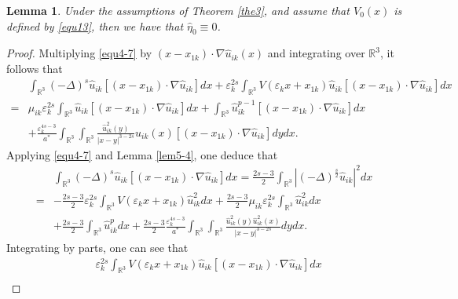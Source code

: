 \documentclass[reqno, 11pt]{amsart} %
\numberwithin{equation}{section}
\newtheorem{lemma}[theorem]{Lemma}
\begin{document}
	\begin{lemma}\label{lem4-4}
		Under the assumptions of Theorem \ref{the3}, and assume that $V_{0}(x)$ is defined by \eqref{equ13}, then we have that $\hat{\eta}_{0}\equiv0$.
	\end{lemma}
	\begin{proof}
		Multiplying \eqref{equ4-7} by $(x-x_{1k})\cdot\nabla\hat{u}_{ik}(x)$ and integrating over $\mathbb{R}^{3}$, it follows that
		\begin{equation}\label{equ4-29}
			\begin{split}
				&\int_{\mathbb{R}^{3}}(-\Delta)^{s}\hat{u}_{ik}[(x-x_{1k})\cdot\nabla\hat{u}_{ik}]dx+\varepsilon_{k}^{2s}\int_{\mathbb{R}^{3}}V(\varepsilon_{k}x+x_{1k})\hat{u}_{ik}[(x-x_{1k})\cdot\nabla\hat{u}_{ik}]dx\\
				=&\mu_{ik}\varepsilon_{k}^{2s}\int_{\mathbb{R}^{3}}\hat{u}_{ik}[(x-x_{1k})\cdot\nabla\hat{u}_{ik}]dx+\int_{\mathbb{R}^{3}}\hat{u}_{ik}^{p-1}[(x-x_{1k})\cdot\nabla\hat{u}_{ik}]dx\\
				&+\frac{\varepsilon_{k}^{4s-3}}{a^{\ast}}\int_{\mathbb{R}^{3}}\int_{\mathbb{R}^{3}}\frac{\hat{u}_{ik}^{2}(y)}{|x-y|^{3-2s}}\hat{u}_{ik}(x)[(x-x_{1k})\cdot\nabla\hat{u}_{ik}]dydx.
			\end{split}
		\end{equation}
		Applying \eqref{equ4-7} and Lemma \ref{lem5-4}, one deduce that
		\begin{equation}\label{equ4-30}
			\begin{split}
				&\int_{\mathbb{R}^{3}}(-\Delta)^{s}\hat{u}_{ik}[(x-x_{1k})\cdot\nabla\hat{u}_{ik}]dx=\frac{2s-3}{2} \int_{\mathbb{R}^3} \left| (-\Delta)^{\frac{s}{2}}\hat{u}_{ik}\right| ^2dx\\
				=&-\frac{2s-3}{2}\varepsilon_{k}^{2s}\int_{\mathbb{R}^{3}} V(\varepsilon_{k}x+x_{1k})\hat{u}_{ik}^{2}dx+ \frac{2s-3}{2}\mu_{ik}\varepsilon_{k}^{2s}\int_{\mathbb{R}^{3}}\hat{u}_{ik}^{2}dx\\
				&+\frac{2s-3}{2}\int_{\mathbb{R}^{3}}\hat{u}_{ik}^{p}dx+\frac{2s-3}{2}\frac{\varepsilon_{k}^{4s-3}}{a^{\ast}}\int_{\mathbb{R}^{3}}\int_{\mathbb{R}^{3}}\frac{\hat{u}_{ik}^{2}(y)\hat{u}_{ik}^{2}(x)}{|x-y|^{3-2s}}dydx.
			\end{split}
		\end{equation}
		Integrating by parts, one can see that
		\begin{equation}\label{equ4-31}
			\begin{split}
				&\varepsilon_{k}^{2s}\int_{\mathbb{R}^{3}}V(\varepsilon_{k}x+x_{1k})\hat{u}_{ik}[(x-x_{1k})\cdot\nabla\hat{u}_{ik}]dx\\

\end{split}
\end{equation}
\end{proof}
\end{document}
